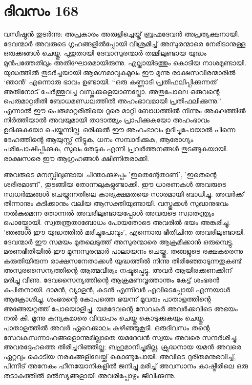 \section{ദിവസം 168}


വസിഷ്ഠൻ തുടർന്നു: അപ്രകാരം അരുളിച്ചെയ്ത് ബ്രഹ്മദേവൻ അപ്രത്യക്ഷനായി. ദേവന്മാർ അവരുടെ ഗൃഹങ്ങളില്‍പ്പോയി വിശ്രമിച്ച് അസുരന്മാരെ നേരിടാനുള്ള ഒരുക്കങ്ങൾ ചെയ്തു. പുതുതായി ദേവാസുരന്മാർ തമ്മിലുണ്ടായ യുദ്ധം മുന്‍പത്തേതിലും അതിഘോരമായിരുന്നു. എല്ലായിടത്തും കൊടിയ നാശമുണ്ടായി. യുദ്ധത്തിൽ തുടർച്ചയായി ആമഗ്നമാവുകമൂലം ഈ മൂന്നു രാക്ഷസവീരന്മാരിൽ ‘ഞാൻ’ എന്നൊരു ഭാവം ഉണ്ടായി. “ഒരു കണ്ണാടി പ്രതിഫലിപ്പിക്കുന്നത് അതിനോട് ചേർത്തുവച്ച വസ്തുക്കളെയാണല്ലോ. അതുപോലെ ഒരുവന്റെ പെരുമാറ്റരീതി ബോധമണ്ഡലത്തിൽ അഹംഭാവമായി പ്രതിഫലിക്കുന്നു.” എന്നാൽ ഈ പെരുമാറ്റരീതിയെ ദൂരെ മാറ്റി ബോധത്തിൽ നിന്നും അകലത്തിൽ നിർത്തിയാൽ അവയുമായി താദാത്മ്യം പ്രാപിക്കുകയോ അഹംഭാവം ഉദിക്കുകയോ ചെയ്യുന്നില്ല. ഒരിക്കൽ ഈ അഹംഭാവം ഉദിച്ചുപോയാൽ പിന്നെ ദേഹത്തിന്റെ ആയുസ്സ് നീട്ടുക, ധനം സമ്പാദിക്കുക, ആരോഗ്യം പരിപോഷിപ്പിക്കുക, സുഖം തേടുക എന്നി പ്രവർത്തനങ്ങൾ തുടങ്ങുകയായി. രാക്ഷസരെ ഈ ആഗ്രഹങ്ങൾ ക്ഷീണിതരാക്കി.

അവരുടെ മനസ്സിലുണ്ടായ ചിന്താക്കുഴപ്പം 'ഇതെന്റേതാണ്‌', 'ഇതെന്റെ ശരീരമാണ്‌', തുടങ്ങിയ തോന്നലുകളുണ്ടാക്കി. ഈ ധാരണകൾ അവരുടെ സ്വധര്‍മ്മങ്ങള്‍ ചെയ്യുന്നതിലെ കാര്യക്ഷമതയെ സാരമായി ബാധിച്ചു. അവർക്ക് തിന്നാനും കുടിക്കാനും വലിയ ആസക്തിയുണ്ടായി. വസ്തുക്കൾ സുഖാനുഭവം നല്‍കുമെന്ന തോന്നല്‍ അവരിലുണ്ടായപ്പോള്‍  അവരുടെ സ്വാതന്ത്ര്യം പൊയ്പ്പോയി. സ്വതന്ത്രതാബോധം പോയതോടെ അവരിൽ ഭയം അങ്കുരിച്ചു. 'ഞങ്ങൾ ഈ യുദ്ധത്തിൽ മരിച്ചുപോവും', എന്നൊരു ഭീതിചിന്ത അവരിലുണ്ടായി. ദേവന്മാർ ഈ സമയം മുതലെടുത്ത് അസുരന്മാരെ ആക്രമിക്കാൻ ഒരുമ്പെട്ടു. മരണഭീതിയിൽ ഈ മൂന്നസുരന്മാർ പാലായനം ചെയ്തു. തങ്ങളുടെ രക്ഷകരെന്നു കരുതിയിരുന്ന രാക്ഷസനേതാക്കൾ യുദ്ധത്തിൽ നിന്നു തിരിഞ്ഞോടുന്നതുകണ്ട് അസുരസൈന്യത്തിന്റെ ആത്മവീര്യം നഷ്ടപ്പെട്ടു. അവർ ആയിരക്കണക്കിന്‌ മരിച്ചു വീണു. ദേവസൈന്യത്തിന്റെ ആക്രമണവൃത്താന്തം കേട്ട് ശംഭരൻ കുപിതനായി. ദാമൻ, വ്യാളൻ, കടൻ എന്നിവർ എവിടെപ്പോയി എന്നയാൾ ആക്രോശിച്ചു. ശംഭരന്റെ കോപത്തെ ഭയന്ന് മൂവരും പാതാളത്തിന്റെ അങ്ങേയറ്റത്ത് പോയൊളിച്ചു. യമദേവന്റെ സേവകർ അവർക്കവിടെ അഭയം നൽ കി. മൂന്നു കന്യകമാരെ വിവാഹം ചെയ്തു കൊടുക്കുകയും ചെയ്തു. പാതാളത്തിൽ അവർ ഏറെക്കാലം കഴിഞ്ഞുകൂടി. ഒരുദിവസം തന്റെ സേവകസന്നാഹങ്ങളൊന്നുമില്ലാതെ യമദേവൻ സ്വയം അവരെ സന്ദർശിച്ചു. അവരദ്ദേഹത്തെ തിരിച്ചറിഞ്ഞില്ല; ബഹുമാനിച്ചുമില്ല. ക്രുദ്ധനായ യമൻ അവരെ ഏറ്റവും കൊടിയ നരകങ്ങളിലേയ്ക്ക് കൊണ്ടുപോയി. അവിടെ ദുരിതമനുഭവിച്ച്, പിന്നീട് അനേകം ഹീനയോനികളിൽ ജനിച്ചു മരിച്ച് അവസാനം കാഷ്മീരിലെ ഒരു തടാകത്തിൽ മൽസ്യങ്ങളായി അവരിപ്പോഴും ജീവിക്കുന്നു. 

